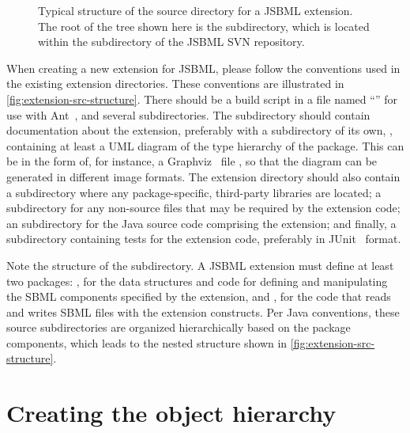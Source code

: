 \begin{wrapfigure}[22]{r}{2.05in}
  \vspace*{-3.5ex}
  \caption{Typical structure of the source directory for a JSBML extension.
    The root of the tree shown here is the  subdirectory,
    which is located within the  subdirectory of the JSBML SVN
    repository.}
  \label{fig:extension-src-structure}
\end{wrapfigure}
When creating a new extension for JSBML, please follow the conventions used
in the existing extension directories.  These conventions are illustrated in
\vref{fig:extension-src-structure}.  There should be a build script in a file
named ``'' for use with Ant~\citep{ApacheAnt}, and several
subdirectories.  The  subdirectory should contain documentation
about the extension, preferably with a subdirectory of its own, ,
containing at least a UML diagram of the type hierarchy of the package.  This
can be in the form of, for instance, a Graphviz~\cite{graphvizWebsite} file
, so that the diagram can be generated in different
image formats.  The extension directory should also contain a 
subdirectory where any package-specific, third-party libraries are located; a
 subdirectory for any non-source files that may be required
by the extension code; an  subdirectory for the Java source code
comprising the extension; and finally, a  subdirectory containing
tests for the extension code, preferably in JUnit~\cite{junitWebsite}
format.

Note the structure of the  subdirectory. A JSBML extension must
define at least two packages: , for the
data structures and code for defining and manipulating the SBML components
specified by the extension, and , for the
code that reads and writes SBML files with the extension
constructs.  Per Java conventions, these source subdirectories are
organized hierarchically based on the package components, which leads to
the nested structure shown in \vref{fig:extension-src-structure}.


\section{Creating the object hierarchy}
\label{sec:creating-obj-hierarchy}

